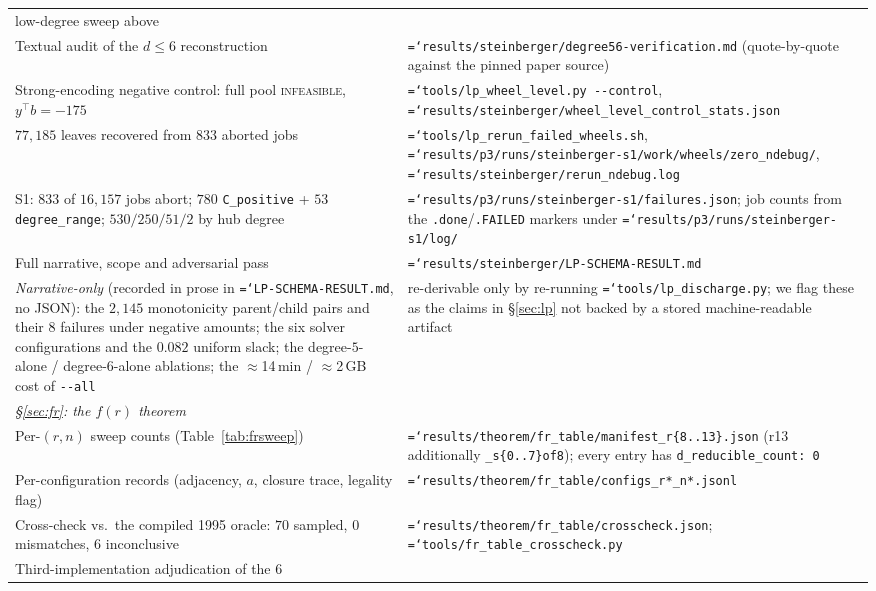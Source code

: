 \documentclass[11pt]{article}
\theoremstyle{definition}
\newcommand{\art}[1]{{\texttt{\hyphenchar\font=`\-\relax #1}}}
\begin{document}
{\begin{longtable}{p{}p{}}
  low-degree sweep above \\
Textual audit of the $d\le6$ reconstruction &
  \art{results/steinberger/degree56-verification.md} (quote-by-quote against the
  pinned paper source) \\
Strong-encoding negative control: full pool \textsc{infeasible}, $y^\top b=-175$ &
  \art{tools/lp\_wheel\_level.py -{}-control},
  \art{results/steinberger/wheel\_level\_control\_stats.json} \\
$77{,}185$ leaves recovered from $833$ aborted jobs &
  \art{tools/lp\_rerun\_failed\_wheels.sh},
  \art{results/p3/runs/steinberger-s1/work/wheels/zero\_ndebug/},
  \art{results/steinberger/rerun\_ndebug.log} \\
S1: $833$ of $16{,}157$ jobs abort; $780$ \texttt{C\_positive} + $53$
  \texttt{degree\_range}; $530/250/51/2$ by hub degree &
  \art{results/p3/runs/steinberger-s1/failures.json};
  job counts from the \texttt{.done}/\texttt{.FAILED} markers under
  \art{results/p3/runs/steinberger-s1/log/} \\
Full narrative, scope and adversarial pass &
  \art{results/steinberger/LP-SCHEMA-RESULT.md} \\
\emph{Narrative-only} (recorded in prose in
  \art{LP-SCHEMA-RESULT.md}, no JSON): the $2{,}145$ monotonicity parent/child pairs
  and their $8$ failures under negative amounts; the six solver configurations and the
  $0.082$ uniform slack; the degree-$5$-alone / degree-$6$-alone ablations; the
  $\approx$14\,min / $\approx$2\,GB cost of \texttt{-{}-all}
  & re-derivable only by re-running \art{tools/lp\_discharge.py}; we flag these as
  the claims in \S\ref{sec:lp} not backed by a stored machine-readable artifact \\
\midrule
\multicolumn{2}{l}{\emph{\S\ref{sec:fr}: the $f(r)$ theorem}}\\[2pt]
Per-$(r,n)$ sweep counts (Table~\ref{tab:frsweep}) &
  \art{results/theorem/fr\_table/manifest\_r\{8..13\}.json} (r13 additionally
  \texttt{\_s\{0..7\}of8}); every entry has \texttt{d\_reducible\_count: 0} \\
Per-configuration records (adjacency, $a$, closure trace, legality flag) &
  \art{results/theorem/fr\_table/configs\_r*\_n*.jsonl} \\
Cross-check vs.\ the compiled 1995 oracle: $70$ sampled, $0$ mismatches,
  $6$ inconclusive &
  \art{results/theorem/fr\_table/crosscheck.json};
  \art{tools/fr\_table\_crosscheck.py} \\
Third-implementation adjudication of the $6$ &

\end{longtable}}
\end{document}
